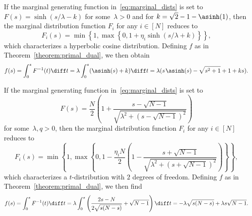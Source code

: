 \documentclass[11pt, a4paper, oneside, reqno]{article}
\begin{document}
	\begin{example}
	If the marginal generating function in~\eqref{eq:marginal_dists} is set to $F(s) = \sinh(s/\lambda - k)$ for some~$\lambda > 0$ and for $k = \sqrt{2} - 1 - \asinh(1)$, then the marginal distribution function $F_i$ for any $i\in[N]$ reduces to 
	\[
	   F_i(s) = \min\left\{1, \max\left\{0, 1 + \eta_i \sinh(s/\lambda + k) \right\} \right\},
	\]
	which characterizes a hyperbolic cosine distribution. Defining $f$ as in Theorem~\ref{theorem:primal_dual}, we then obtain
	\begin{align*}
	    f(s) = \int_0^s F^{-1}(t) \diff t 
	    = \lambda \int_0^s (\asinh(s) + k ) \diff t 
	    = \lambda(s \hspace{0.1em} \asinh(s) - \sqrt{s^2 + 1} + 1 + ks).
	\end{align*}
	\end{example} 
	
	\begin{example}
	If the marginal generating function in~\eqref{eq:marginal_dists} is set to 
	\[ F(s) = \frac{N}{2}\left(1 + \frac{s - \sqrt{N-1}} {\sqrt{\lambda^2 + (s - \sqrt{N-1})^{2}}}\right) \]
	for some~$\lambda, q>0$, then the marginal distribution function $F_i$ for any $i\in[N]$ reduces to
	\[
	   F_i(s) = \min\left\{1, \max\left\{0, 1 - \frac{\eta_i N}{2} \left(1 - \frac{s + \sqrt{N-1}} {\sqrt{\lambda^2 + (s + \sqrt{N-1})^{2}}}\right) \right\} \right\},
	\]
	which characterizes a $t$-distribution with $2$ degrees of freedom. Defining $f$ as in Theorem~\ref{theorem:primal_dual}, we then find
	\begin{align*}
	    f(s) = \int_0^s F^{-1}(t) \diff t = \lambda \int_0^s  \left( \frac{2s - N}{2 \sqrt{s(N-s)}} + \sqrt{N-1} \right) \diff t = -\lambda \sqrt{s(N-s)} + \lambda s \sqrt{N-1}.
	\end{align*}
	\end{example}
    
	\renewcommand\thesection{\Alph{section}}
\end{document}
